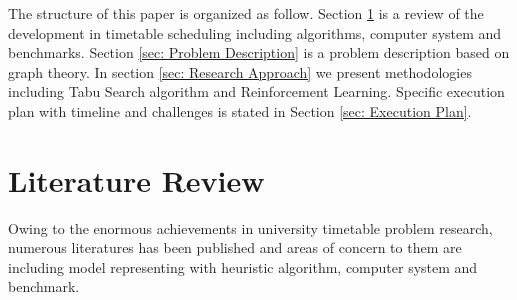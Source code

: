 \documentclass{article}
\begin{document}
The structure of this paper is organized as follow. Section \ref{sec: Literature Review} is a review of the development in timetable scheduling including algorithms, computer system and benchmarks. Section \ref{sec: Problem Description} is a problem description based on graph theory. In section \ref{sec: Research Approach} we present methodologies  including Tabu Search algorithm and Reinforcement Learning. Specific execution plan with timeline and challenges is stated in Section \ref{sec: Execution Plan}.

\newpage

\section{Literature Review}
\label{sec: Literature Review}

Owing to the enormous achievements in university timetable problem research, numerous literatures has been published and areas of concern to them are including model representing with heuristic algorithm, computer system and benchmark.
\end{document}
